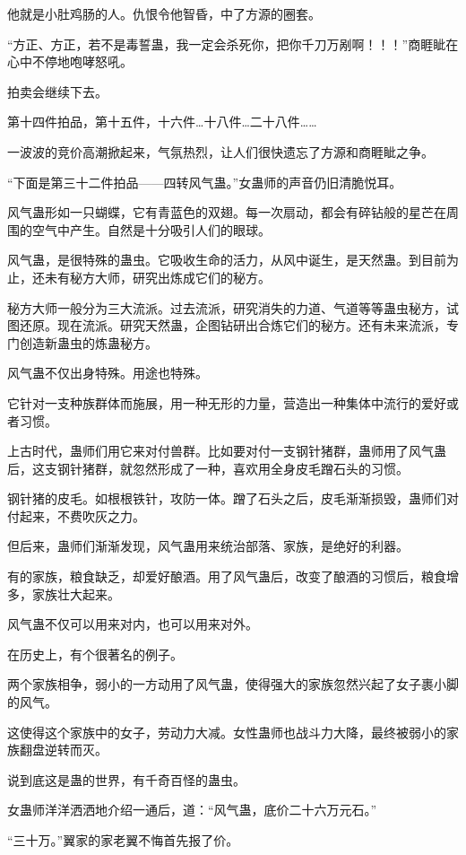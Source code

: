 \begin{this_body}
他就是小肚鸡肠的人。仇恨令他智昏，中了方源的圈套。

“方正、方正，若不是毒誓蛊，我一定会杀死你，把你千刀万剐啊！！！”商睚眦在心中不停地咆哮怒吼。

拍卖会继续下去。

第十四件拍品，第十五件，十六件…十八件…二十八件……

一波波的竞价高潮掀起来，气氛热烈，让人们很快遗忘了方源和商睚眦之争。

“下面是第三十二件拍品——四转风气蛊。”女蛊师的声音仍旧清脆悦耳。

风气蛊形如一只蝴蝶，它有青蓝色的双翅。每一次扇动，都会有碎钻般的星芒在周围的空气中产生。自然是十分吸引人们的眼球。

风气蛊，是很特殊的蛊虫。它吸收生命的活力，从风中诞生，是天然蛊。到目前为止，还未有秘方大师，研究出炼成它们的秘方。

秘方大师一般分为三大流派。过去流派，研究消失的力道、气道等等蛊虫秘方，试图还原。现在流派。研究天然蛊，企图钻研出合炼它们的秘方。还有未来流派，专门创造新蛊虫的炼蛊秘方。

风气蛊不仅出身特殊。用途也特殊。

它针对一支种族群体而施展，用一种无形的力量，营造出一种集体中流行的爱好或者习惯。

上古时代，蛊师们用它来对付兽群。比如要对付一支钢针猪群，蛊师用了风气蛊后，这支钢针猪群，就忽然形成了一种，喜欢用全身皮毛蹭石头的习惯。

钢针猪的皮毛。如根根铁针，攻防一体。蹭了石头之后，皮毛渐渐损毁，蛊师们对付起来，不费吹灰之力。

但后来，蛊师们渐渐发现，风气蛊用来统治部落、家族，是绝好的利器。

有的家族，粮食缺乏，却爱好酿酒。用了风气蛊后，改变了酿酒的习惯后，粮食增多，家族壮大起来。

风气蛊不仅可以用来对内，也可以用来对外。

在历史上，有个很著名的例子。

两个家族相争，弱小的一方动用了风气蛊，使得强大的家族忽然兴起了女子裹小脚的风气。

这使得这个家族中的女子，劳动力大减。女性蛊师也战斗力大降，最终被弱小的家族翻盘逆转而灭。

说到底这是蛊的世界，有千奇百怪的蛊虫。

女蛊师洋洋洒洒地介绍一通后，道：“风气蛊，底价二十六万元石。”

“三十万。”翼家的家老翼不悔首先报了价。


\end{this_body}
